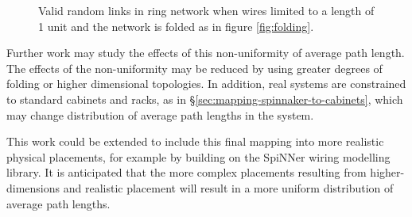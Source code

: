 			\begin{figure}
				\center
				
				\caption[Valid random links in a folded ring network with short
				wires.]{Valid random links in ring network when wires limited to a
				length of 1 unit and the network is folded as in figure
				\ref{fig:folding}.}
				\label{fig:ringNetworkLimitedWires}
			\end{figure}
			
			Further work may study the effects of this non-uniformity of average path
			length. The effects of the non-uniformity may be reduced by using greater
			degrees of folding or higher dimensional topologies. In addition, real
			systems are constrained to standard cabinets and racks, as in
			\S\ref{sec:mapping-spinnaker-to-cabinets}, which may change distribution
			of average path lengths in the system.
			
			This work could be extended to include this final mapping into more
			realistic physical placements, for example by building on the SpiNNer
			wiring modelling library. It is anticipated that the more complex
			placements resulting from higher-dimensions and realistic placement will
			result in a more uniform distribution of average path lengths.
